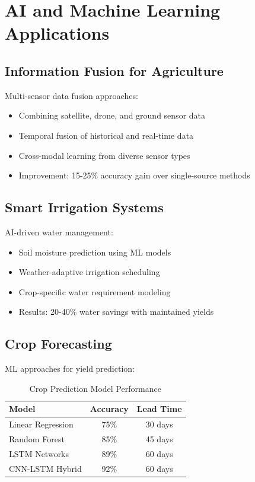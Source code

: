 \documentclass[12pt,a4paper]{article}
\begin{document}
\section{AI and Machine Learning Applications}

\subsection{Information Fusion for Agriculture}

Multi-sensor data fusion approaches:
\begin{itemize}
    \item Combining satellite, drone, and ground sensor data
    \item Temporal fusion of historical and real-time data
    \item Cross-modal learning from diverse sensor types
    \item Improvement: 15-25\% accuracy gain over single-source methods
\end{itemize}

\subsection{Smart Irrigation Systems}

AI-driven water management:
\begin{itemize}
    \item Soil moisture prediction using ML models
    \item Weather-adaptive irrigation scheduling
    \item Crop-specific water requirement modeling
    \item Results: 20-40\% water savings with maintained yields
\end{itemize}

\subsection{Crop Forecasting}

ML approaches for yield prediction:
\begin{table}[H]
\centering
\caption{Crop Prediction Model Performance}
\begin{tabular}{lcc}
\toprule
\textbf{Model} & \textbf{Accuracy} & \textbf{Lead Time} \\
\midrule
Linear Regression & 75\% & 30 days \\
Random Forest & 85\% & 45 days \\
LSTM Networks & 89\% & 60 days \\
CNN-LSTM Hybrid & 92\% & 60 days \\
\bottomrule
\end{tabular}
\end{table}
\end{document}
